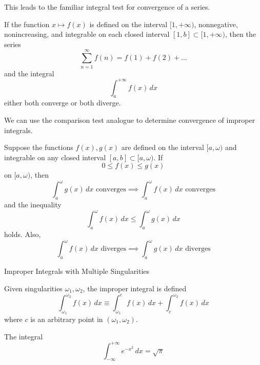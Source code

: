   This leads to the familiar integral test for convergence of a series. 

  \begin{theorem}
  If the function $x \mapsto f(x)$ is defined on the interval $[1, +\infty)$, nonnegative, nonincreasing, and integrable on each closed interval $[1, b] \subset [1, +\infty)$, then the series 
  \[\sum_{n=1}^\infty f(n) = f(1) + f(2) + \ldots\]
  and the integral 
  \[\int_a^{+\infty} f(x)\,dx\]
  either both converge or both diverge. 
  \end{theorem}

  We can use the comparison test analogue to determine convergence of improper integrals. 

  \begin{theorem}
  Suppose the functions $f(x), g(x)$ are defined on the interval $[a, \omega)$ and integrable on any closed interval $[a, b] \subset [a, \omega)$. If 
  \[0 \leq f(x) \leq g(x)\]
  on $[a, \omega)$, then 
  \[\int_a^\omega g(x)\,dx \text{ converges} \implies \int_a^\omega f(x)\,dx \text{ converges}\]
  and the inequality 
  \[\int_a^\omega f(x)\,dx \leq \int_a^\omega g(x)\,dx\]
  holds. Also, 
  \[\int_a^\omega f(x)\,dx \text{ diverges} \implies \int_a^\omega g(x)\,dx \text{ diverges}\]
  \end{theorem}

  Improper Integrals with Multiple Singularities

  \begin{definition}
    Given singularities $\omega_1, \omega_2$, the improper integral is defined
    \[\int_{\omega_1}^{\omega_2} f(x)\,dx \equiv \int_{\omega_1}^c f(x)\,dx + \int_c^{\omega_2} f(x)\,dx\]
    where $c$ is an arbitrary point in $(\omega_1, \omega_2)$. 
  \end{definition}

  \begin{example}
  The integral 
  \[\int_{-\infty}^{+\infty} e^{-x^2}\,dx = \sqrt{\pi}\]
  \end{example}

